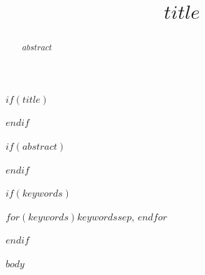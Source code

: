 \documentclass[conference]{IEEEtran}
\begin{document}
$if(title)$
\title{$title$}
$endif$

\author{
}

\maketitle

$if(abstract)$
\begin{abstract}
$abstract$
\end{abstract}
$endif$

$if(keywords)$
\begin{IEEEkeywords}
$for(keywords)$$keywords$$sep$, $endfor$
\end{IEEEkeywords}
$endif$

$body$
\end{document}
